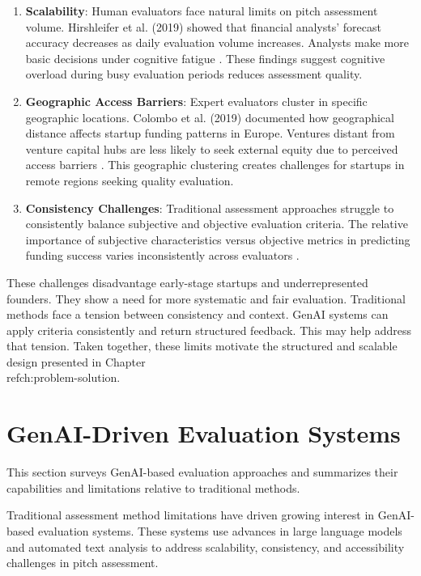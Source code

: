 \begin{enumerate}
    \item \textbf{Scalability}: Human evaluators face natural limits on pitch assessment volume. Hirshleifer et al. (2019) showed that financial analysts' forecast accuracy decreases as daily evaluation volume increases. Analysts make more basic decisions under cognitive fatigue \cite{Hirshleifer2019}. These findings suggest cognitive overload during busy evaluation periods reduces assessment quality.

    \item \textbf{Geographic Access Barriers}: Expert evaluators cluster in specific geographic locations. Colombo et al. (2019) documented how geographical distance affects startup funding patterns in Europe. Ventures distant from venture capital hubs are less likely to seek external equity due to perceived access barriers \cite{Colombo2019}. This geographic clustering creates challenges for startups in remote regions seeking quality evaluation.

    \item \textbf{Consistency Challenges}: Traditional assessment approaches struggle to consistently balance subjective and objective evaluation criteria. The relative importance of subjective characteristics versus objective metrics in predicting funding success varies inconsistently across evaluators \cite{Tsay2021VISUALSDI}.
\end{enumerate}

These challenges disadvantage early-stage startups and underrepresented founders. They show a need for more systematic and fair evaluation. Traditional methods face a tension between consistency and context. GenAI systems can apply criteria consistently and return structured feedback. This may help address that tension. Taken together, these limits motivate the structured and scalable design presented in Chapter~\\ref{ch:problem-solution}.

\section{GenAI-Driven Evaluation Systems}
\label{sec:ai-systems}

This section surveys GenAI-based evaluation approaches and summarizes their capabilities and limitations relative to traditional methods.

Traditional assessment method limitations have driven growing interest in GenAI-based evaluation systems. These systems use advances in large language models and automated text analysis to address scalability, consistency, and accessibility challenges in pitch assessment.

